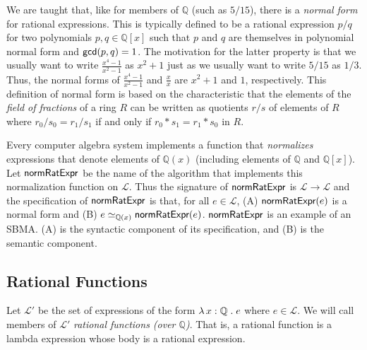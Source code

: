 \documentclass[fleqn]{llncs}
\newcommand{\QQ}{\ensuremath{\mathbb{Q}}}
\newcommand{\NRE}{\ensuremath{\mname{normRatExpr}}}
\newcommand{\Lang}{\ensuremath{\mathcal{L}}}
\newcommand{\Langp}{\ensuremath{\mathcal{L}'}}
\begin{document}
We are taught that, like for members of $\QQ$ (such as $5/15$), there
is a \emph{normal form} for rational expressions. This is typically
defined to be a rational expression $p/q$ for two polynomials $p,q \in \QQ[x]$
such that $p$ and $q$ are themselves in polynomial normal form and
$\mbox{\sf gcd}(p,q) = 1$.  The motivation for the latter
property is that we usually want to write $\frac{x^4-1}{x^2-1}$ as
$x^2 + 1$ just as we usually want to write $5/15$ as $1/3$.  Thus, the
normal forms of $\frac{x^4-1}{x^2-1}$ and $\frac{x}{x}$ are $x^2 + 1$
and $1$, respectively.  This definition of normal form is based on the
characteristic that the elements of the \emph{field of fractions} of a
ring $R$ can be written as quotients $r/s$ of elements of $R$ where
$r_0/s_0 = r_1/s_1$ if and only if $r_0 * s_1 = r_1 * s_0$ in $R$.

Every computer algebra system implements a function that
\emph{normalizes} expressions that denote elements of $\QQ(x)$
(including elements of $\QQ$ and $\QQ[x]$).  
Let {\NRE} be the name of
the algorithm that implements this normalization function on $\Lang$.
Thus the signature of $\NRE$ is $\Lang \rightarrow \Lang$ and the
specification of $\NRE$ is that, for all $e \in \Lang$, (A) $\NRE(e)$
is a normal form and (B) $e \simeq_{\QQ(x)} \NRE(e)$.  $\NRE$ is an
example of an SBMA.  (A) is the syntactic component of its
specification, and (B) is the semantic component.

\subsection{Rational Functions}

Let $\Langp$ be the set of expressions of the form $\LambdaApp x : \QQ
\mdot e$ where $e \in \Lang$.  We will call members of $\Langp$
\emph{rational functions (over $\QQ$)}.  That is, a rational function
is a lambda expression whose body is a rational expression.
\end{document}
